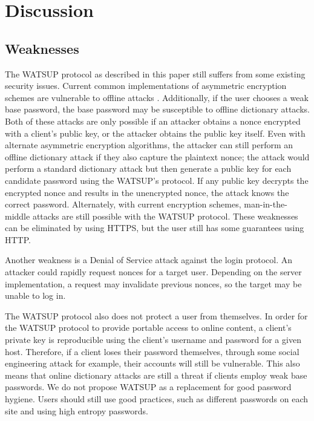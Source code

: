 \section{Discussion}
\label{sec:discussion}

\subsection{Weaknesses}

The WATSUP protocol as described in this paper still suffers from some existing security issues. Current common implementations of asymmetric encryption schemes are vulnerable to offline attacks \cite{Blumenthal:2007}. Additionally, if the user chooses a weak base password, the base password may be susceptible to offline dictionary attacks. Both of these attacks are only possible if an attacker obtains a nonce encrypted with a client's public key, or the attacker obtains the public key itself. Even with alternate asymmetric encryption algorithms, the attacker can still perform an offline dictionary attack if they also capture the plaintext nonce; the attack would perform a standard dictionary attack but then generate a public key for each candidate password using the WATSUP's protocol. If any public key decrypts the encrypted nonce and results in the unencrypted nonce, the attack knows the correct password. Alternately, with current encryption schemes, man-in-the-middle attacks are still possible with the WATSUP protocol. These weaknesses can be eliminated by using HTTPS, but the user still has some guarantees using HTTP.

Another weakness is a Denial of Service attack against the login protocol. An attacker could rapidly request nonces for a target user. Depending on the server implementation, a request may invalidate previous nonces, so the target may be unable to log in.

The WATSUP protocol also does not protect a user from themselves. In order for the WATSUP protocol to provide portable access to online content, a client's private key is reproducible using the client's username and password for a given host. Therefore, if a client loses their password themselves, through some social engineering attack for example, their accounts will still be vulnerable. This also means that online dictionary attacks are still a threat if clients employ weak base passwords. We do not propose WATSUP as a replacement for good password hygiene. Users should still use good practices, such as different passwords on each site and using high entropy passwords.

